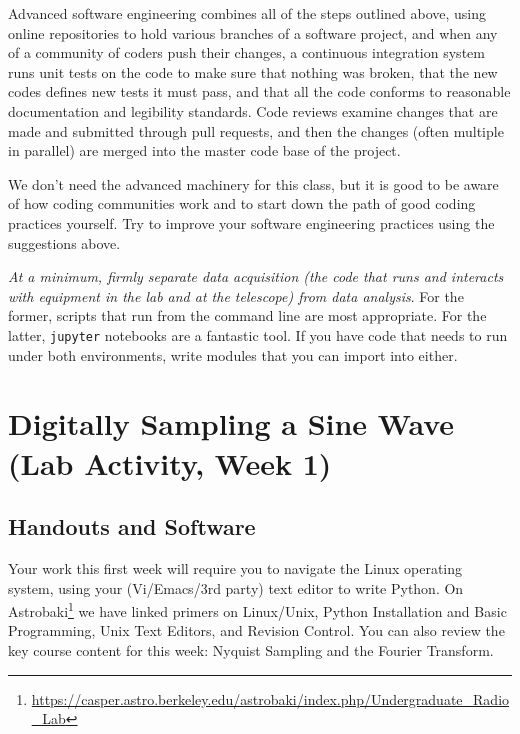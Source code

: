 \documentclass[11pt,preprint]{aastex}
\begin{document}
\noindent
Advanced software engineering combines all of the steps outlined above, using online repositories to hold various
branches of a software project, and when any of a community of coders push their changes, a continuous integration system runs
unit tests on the code to make sure that nothing was broken, that the new codes defines new tests it must pass, and that
all the code conforms to reasonable documentation and legibility standards.  Code reviews examine changes that are
made and submitted through pull requests, and then the changes (often multiple in parallel) are merged into the master code base of the
project.

We don't need the advanced machinery for this class, but it is good to be aware of how coding communities work and
to start down the path of good coding practices yourself. Try to improve your software engineering practices using the
suggestions above.

{\it At a minimum, firmly separate data acquisition (the code that runs and interacts with
equipment in the lab and at the telescope) from data analysis}.  For the former, scripts that run from the command line
are most appropriate. For the latter, {\tt jupyter} notebooks are a fantastic tool. If you have code that needs to
run under both environments, write modules that you can import into either.


\section{Digitally Sampling a Sine Wave (Lab Activity, Week 1)}
\label{nyquist}

\subsection{Handouts and Software}

\noindent
Your work this first week will require you to navigate
the Linux operating system, using your (Vi/Emacs/3rd party) text editor to write Python. 
On Astrobaki\footnote{\url{https://casper.astro.berkeley.edu/astrobaki/index.php/Undergraduate\_Radio\_Lab}}
we have linked primers on
Linux/Unix, Python Installation and Basic Programming, Unix Text Editors, and Revision Control.  You can
also review the key course content for this week: Nyquist Sampling and the Fourier Transform.
\end{document}
